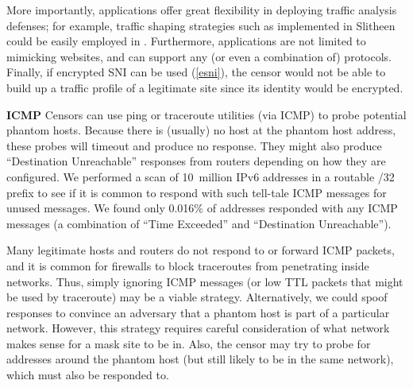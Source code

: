 \documentclass[letterpaper,twocolumn,10pt]{article}
\renewcommand{\paragraph}[1]{\smallskip\noindent\textbf{#1\quad}}
\begin{document}
More importantly, \scheme applications offer great flexibility in deploying traffic analysis defenses; for example, traffic shaping strategies such as implemented in Slitheen~\cite{slitheen16} could be easily employed in \scheme. Furthermore,
\scheme applications are not limited to mimicking websites, and can support
any (or even a combination of) protocols. Finally, if encrypted SNI can be used (\cref{esni}), the censor would not be able to build up a traffic profile of a legitimate site since its identity would be encrypted.

\paragraph{ICMP}
Censors can use ping or traceroute utilities (via ICMP) to probe potential phantom
hosts. Because there is (usually) no host at the phantom host address, these
probes will timeout and produce no response. They might also produce
``Destination Unreachable'' responses from routers depending on how they are
configured. We performed a scan of 10~million IPv6 addresses in a routable /32
prefix to see if it is common to respond with such tell-tale ICMP messages for
unused messages. We found only 0.016\% of addresses responded with any ICMP
messages (a combination of ``Time Exceeded'' and ``Destination Unreachable'').

Many legitimate hosts and routers do not respond to or forward ICMP packets, and
it is common for firewalls to block traceroutes from penetrating inside
networks. Thus, simply ignoring ICMP messages (or low TTL packets that might be
used by traceroute) may be a viable strategy. %
Alternatively, we could spoof responses to convince an adversary that a 
phantom host is part of a particular network. However, this strategy requires careful
consideration of what network makes sense for a mask site to be in. Also, the
censor may try to probe for addresses around the phantom host (but still likely to
be in the same network), which must also be responded to.




\FigIpBits
\end{document}
